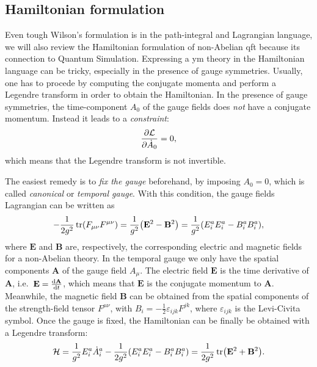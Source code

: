 \subsection{Hamiltonian formulation}
\label{sub:hamiltonian_formulation}

Even tough Wilson's formulation \cite{wilson1974confinement} is in the path-integral and Lagrangian language, we will also review the Hamiltonian formulation of non-Abelian \ac{qft} because its connection to Quantum Simulation.
Expressing a \ac{ym} theory in the Hamiltonian language can be tricky, especially in the presence of gauge symmetries.
Usually, one has to procede by computing the conjugate momenta and perform a Legendre transform in order to obtain the Hamiltonian.
In the presence of gauge symmetries, the time-component $A_0$ of the gauge fields does \emph{not} have a conjugate momentum.
Instead it leads to a \emph{constraint}:
\begin{equation}
    \pdv{\mathcal{L}}{\dot{A}_0} = 0,
\end{equation}
which means that the Legendre transform is not invertible.

The easiest remedy is to \emph{fix the gauge} beforehand, by imposing $A_0 = 0$, which is called \emph{canonical} or \emph{temporal gauge}.
With this condition, the gauge fields Lagrangian can be written as
\begin{equation}
    - \frac{1}{2 g^2} \tr(F_{\mu \nu} F^{\mu \nu})
    = \frac{1}{g^2} \qty( \mathbf{E}^2 - \mathbf{B}^2 )
    = \frac{1}{g^2} \qty(E^a_i E^a_i - B^a_i B^a_i),
    \label{eq:YM_lagrang_temporal_gauge}
\end{equation}
where $\mathbf{E}$ and $\mathbf{B}$ are, respectively, the corresponding electric and magnetic fields for a non-Abelian theory.
In the temporal gauge we only have the spatial components $\mathbf{A}$ of the gauge field $A_{\mu}$.
The electric field $\mathbf{E}$ is the time derivative of $\mathbf{A}$, i.e.~$\mathbf{E} = \dv{\mathbf{A}}{t}$,
which means that $\mathbf{E}$ is the conjugate momentum to $\mathbf{A}$.
Meanwhile, the magnetic field $\mathbf{B}$ can be obtained from the spatial components of the strength-field tensor $F^{\mu \nu}$, with $B_i = - \frac{1}{2} \varepsilon_{ijk} F^{jk}$, where $\varepsilon_{ijk}$ is the Levi-Civita symbol.
Once the gauge is fixed, the Hamiltonian can be finally be obtained with a Legendre transform:
\begin{equation}
    \mathcal{H}
    = \frac{1}{g^2} E^a_i \dot{A}^a_i - \frac{1}{2 g^2} \qty( E^a_i E^a_i - B^a_i B^a_i )
    = \frac{1}{2g^2} \tr ( \mathbf{E}^2 + \mathbf{B}^2 ).
\end{equation}

